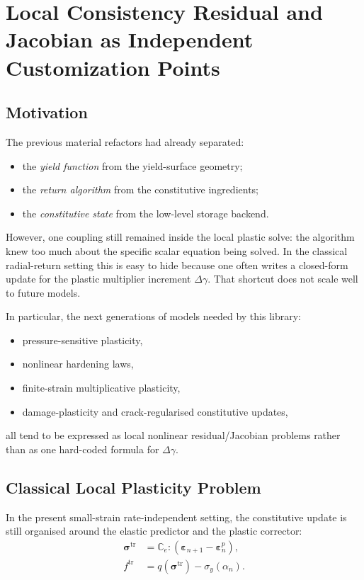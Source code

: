 \chapter{Local Consistency Residual and Jacobian as Independent Customization Points}
\label{ch:local-consistency-residual-and-jacobian}

\section{Motivation}

The previous material refactors had already separated:
\begin{itemize}
  \item the \emph{yield function} from the yield-surface geometry;
  \item the \emph{return algorithm} from the constitutive ingredients;
  \item the \emph{constitutive state} from the low-level storage backend.
\end{itemize}

However, one coupling still remained inside the local plastic solve: the
algorithm knew too much about the specific scalar equation being solved. In the
classical radial-return setting this is easy to hide because one often writes a
closed-form update for the plastic multiplier increment $\Delta\gamma$. That
shortcut does not scale well to future models.

In particular, the next generations of models needed by this library:
\begin{itemize}
  \item pressure-sensitive plasticity,
  \item nonlinear hardening laws,
  \item finite-strain multiplicative plasticity,
  \item damage-plasticity and crack-regularised constitutive updates,
\end{itemize}
all tend to be expressed as local nonlinear residual/Jacobian problems rather
than as one hard-coded formula for $\Delta\gamma$.

\section{Classical Local Plasticity Problem}

In the present small-strain rate-independent setting, the constitutive update is
still organised around the elastic predictor and the plastic corrector:
\begin{align}
  \boldsymbol{\sigma}^{\mathrm{tr}} &= \mathbb{C}_e :
    \left(\boldsymbol{\varepsilon}_{n+1}
          - \boldsymbol{\varepsilon}_n^p\right), \\
  f^{\mathrm{tr}} &= q(\boldsymbol{\sigma}^{\mathrm{tr}})
    - \sigma_y(\alpha_n).
\end{align}


